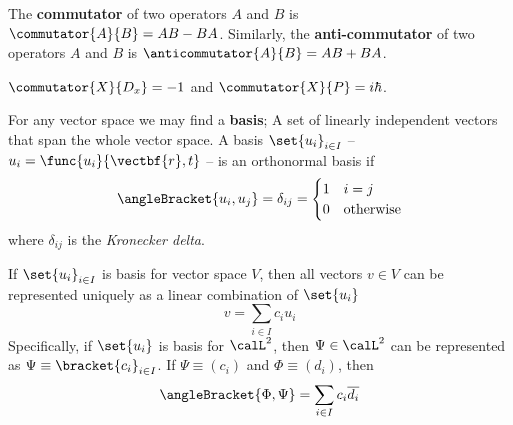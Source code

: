 \begin{definition}
    The \textbf{commutator} of two operators \(A\) and \(B\) is \(\commutator{A}{B} = AB - BA\). Similarly, the \textbf{anti-commutator} of two operators \(A\) and \(B\) is \(\anticommutator{A}{B} = AB + BA\).
\end{definition}

\begin{example}
    \(\commutator{X}{D_x} = -1\) and \(\commutator{X}{P} = i\hbar\).
\end{example}

\begin{definition}
    For any vector space we may find a \textbf{basis}; A set of linearly independent vectors that span the whole vector space. A basis \(\set{u_i}_{i \in I}\) -- \(u_i = \func{u_i}{\vectbf{r},t}\) -- is an orthonormal basis if
    \begin{equation*}
        \angleBracket{u_i,u_j} = \delta_{ij} = \begin{cases}
            1 & i = j              \\
            0 & \mathrm{otherwise}
        \end{cases}
    \end{equation*}
    where \(\delta_{ij}\) is the \textit{Kronecker delta}.
\end{definition}

If \(\set{u_i}_{i \in I}\) is basis for vector space \(V\), then all vectors \(v \in V\) can be represented uniquely as a linear combination of \(\set{u_i}\)
\begin{equation*}
    v = \sum_{i \in I} c_i u_i
\end{equation*}
Specifically, if \(\set{u_i}\) is basis for \(\calL^2\), then \(\Psi \in \calL^2\) can be represented as \(\Psi \equiv \bracket{c_i}_{i \in I}\).
If \(\Psi \equiv (c_i)\) and \(\Phi \equiv (d_i)\), then
\begin{equation*}
    \angleBracket{\Phi, \Psi} = \sum_{i \in I} c_i \overline{d_i}
\end{equation*}

